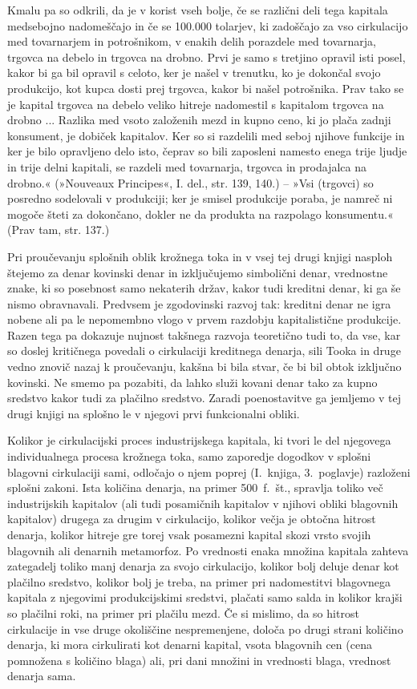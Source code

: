 \documentclass[kapital_02.tex]{subfiles}
\begin{document}
Kmalu \KPEstran pa so odkrili, da je v korist vseh bolje, če se različni deli tega kapitala medsebojno nadomeščajo in če se 100.000 tolarjev, ki zadoščajo za vso cirkulacijo med tovarnarjem in potrošnikom, v enakih delih porazdele med tovarnarja, trgovca na debelo in trgovca na drobno. Prvi je samo s tretjino opravil isti posel, kakor bi ga bil opravil s celoto, ker je našel v trenutku, ko je dokončal svojo produkcijo, kot kupca dosti prej trgovca, kakor bi našel potrošnika. Prav tako se je kapital trgovca na debelo veliko hitreje nadomestil s kapitalom trgovca na drobno ... Razlika med vsoto založenih mezd in kupno ceno, ki jo plača zadnji konsument, je dobiček kapitalov. Ker so si razdelili med seboj njihove funkcije in ker je bilo opravljeno delo isto, čeprav so bili zaposleni namesto enega trije ljudje in trije delni kapitali, se razdeli med tovarnarja, trgovca in prodajalca na drobno.« (»Nouveaux Principes«, I. del., str. 139, 140.) -- »Vsi (trgovci) so posredno sodelovali v produkciji; ker je smisel produkcije poraba, je namreč ni mogoče šteti za dokončano, dokler ne da produkta na razpolago konsumentu.« (Prav tam, str. 137.)

Pri proučevanju splošnih oblik krožnega toka in v vsej tej drugi knjigi nasploh štejemo za denar kovinski denar in izključujemo simbolični denar, vrednostne znake, ki so posebnost samo nekaterih držav, kakor tudi kreditni denar, ki ga še nismo obravnavali. Predvsem je zgodovinski razvoj tak: kreditni denar ne igra nobene ali pa le nepomembno vlogo v prvem razdobju kapitalistične produkcije. Razen tega pa dokazuje nujnost takšnega razvoja teoretično tudi to, da vse, kar so doslej kritičnega povedali o cirkulaciji kreditnega denarja, sili Tooka in druge vedno znovič nazaj k proučevanju, kakšna bi bila stvar, če bi bil obtok izključno kovinski. Ne smemo pa pozabiti, da lahko služi kovani denar tako za kupno sredstvo kakor tudi za plačilno sredstvo. Zaradi poenostavitve ga jemljemo v tej drugi knjigi na splošno le v njegovi prvi funkcionalni obliki.

Kolikor je cirkulacijski proces industrijskega kapitala, ki tvori le del njegovega individualnega procesa krožnega toka, samo zaporedje dogodkov v splošni blagovni cirkulaciji \KPEstran sami, odločajo o njem poprej (I.\ knjiga, 3.\ poglavje) razloženi splošni zakoni. Ista količina denarja, na primer 500\ f.\ št., spravlja toliko več industrijskih kapitalov (ali tudi posamičnih kapitalov v njihovi obliki blagovnih kapitalov) drugega za drugim v cirkulacijo, kolikor večja je obtočna hitrost denarja, kolikor hitreje gre torej vsak posamezni kapital skozi vrsto svojih blagovnih ali denarnih metamorfoz. Po vrednosti enaka množina kapitala zahteva zategadelj toliko manj denarja za svojo cirkulacijo, kolikor bolj deluje denar kot plačilno sredstvo, kolikor bolj je treba, na primer pri nadomestitvi blagovnega kapitala z njegovimi produkcijskimi sredstvi, plačati samo salda in kolikor krajši so plačilni roki, na primer pri plačilu mezd. Če si mislimo, da so hitrost cirkulacije in vse druge okoliščine nespremenjene, določa po drugi strani količino denarja, ki mora cirkulirati kot denarni kapital, vsota blagovnih cen (cena pomnožena s količino blaga) ali, pri dani množini in vrednosti blaga, vrednost denarja sama.
\end{document}
